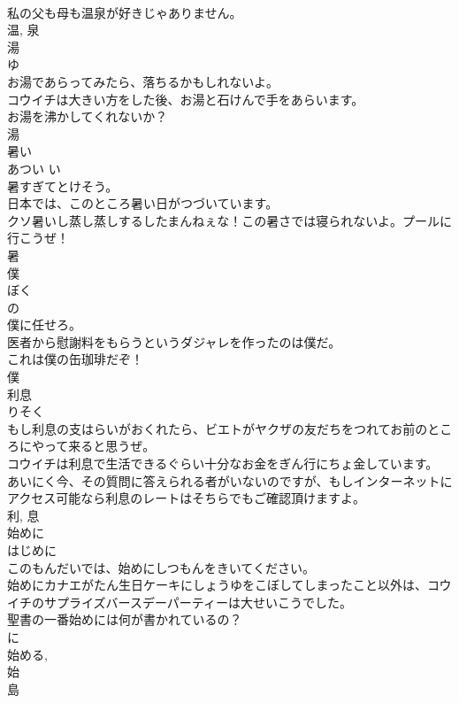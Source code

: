 \documentclass[8pt]{extreport}
\begin{document}
\begin{CJK}{UTF8}{min}
\\	私の父も母も温泉が好きじゃありません。	
\\	温, 泉	
\\	湯	
\\	ゆ	
\\	お湯であらってみたら、落ちるかもしれないよ。	
\\	コウイチは大きい方をした後、お湯と石けんで手をあらいます。	
\\	お湯を沸かしてくれないか？	
\\	湯	
\\	暑い	
\\	あつい	い 
\\	暑すぎてとけそう。	
\\	日本では、このところ暑い日がつづいています。	
\\	クソ暑いし蒸し蒸しするしたまんねぇな！この暑さでは寝られないよ。プールに行こうぜ！	
\\	暑	
\\	僕	
\\	ぼく	
\\	の 
\\	僕に任せろ。	
\\	医者から慰謝料をもらうというダジャレを作ったのは僕だ。	
\\	これは僕の缶珈琲だぞ！	
\\	僕	
\\	利息	
\\	りそく	
\\	もし利息の支はらいがおくれたら、ビエトがヤクザの友だちをつれてお前のところにやって来ると思うぜ。	
\\	コウイチは利息で生活できるぐらい十分なお金をぎん行にちょ金しています。	
\\	あいにく今、その質問に答えられる者がいないのですが、もしインターネットにアクセス可能なら利息のレートはそちらでもご確認頂けますよ。	
\\	利, 息	
\\	始めに	
\\	はじめに	
\\	このもんだいでは、始めにしつもんをきいてください。	
\\	始めにカナエがたん生日ケーキにしょうゆをこぼしてしまったこと以外は、コウイチのサプライズバースデーパーティーは大せいこうでした。	
\\	聖書の一番始めには何が書かれているの？	
\\	に 
\\	始める, 
\\	始	
\\	島	

\end{CJK}
\end{document}
